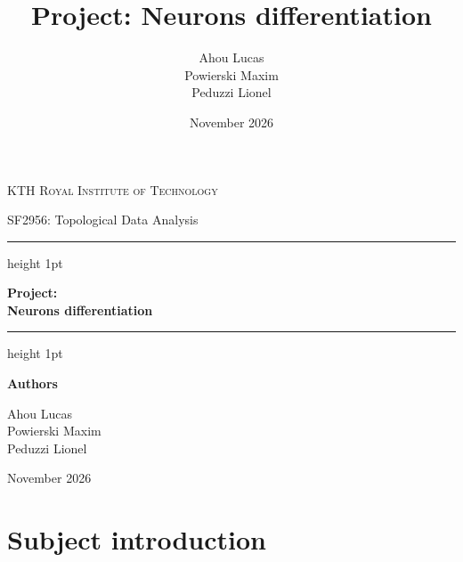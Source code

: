 \documentclass[11pt,a4paper]{article}
\title{Project: Neurons differentiation}
\author{Ahou Lucas\\Powierski Maxim\\Peduzzi Lionel}
\date{November 2026}
\begin{document}
\begin{titlepage}
    \thispagestyle{empty}
    \centering
    \vspace*{2cm}

    {\large \textsc{KTH Royal Institute of Technology}\par}
    \vspace{0.5cm}
    {\large SF2956: Topological Data Analysis\par}

    \vspace{2.5cm}
    \hrule height 1pt
    \vspace{0.8cm}
    {\Huge \bfseries Project:\\[0.3em] Neurons differentiation\par}
    \vspace{0.8cm}
    \hrule height 1pt

    \vspace{3cm}
    {\large \textbf{Authors}\par}
    \vspace{0.4cm}
    {\large
    Ahou Lucas\\[0.2em]
    Powierski Maxim\\[0.2em]
    Peduzzi Lionel\par}

    \vfill
    {\large November 2026\par}
    \vspace{1cm}
\end{titlepage}

\setcounter{page}{1}
\pagestyle{frontmatter}
\setcounter{tocdepth}{2}  %
\tableofcontents
\clearpage
\pagestyle{fancy}

\setcounter{page}{1}

\section{Subject introduction}
\label{sec:intro}
\end{document}
